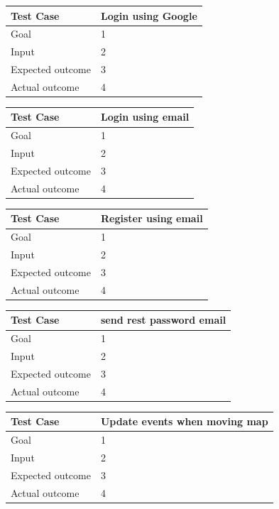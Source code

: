 \documentclass[a4paper]{scrreprt}
\begin{document}
\bigskip
\noindent
\begin{tabularx}{\linewidth}{|l|X|}
	\hline
	\textbf{Test Case} 	& \textbf{Login using Google} \\ \hline
	Goal 				& 1 \\ \hline
	Input 				& 2 \\ \hline
	Expected outcome 	& 3 \\ \hline
	Actual outcome 		& 4 \\ \hline
\end{tabularx}
\bigskip
\noindent
\begin{tabularx}{\linewidth}{|l|X|}
	\hline
	\textbf{Test Case} 	& \textbf{Login using email} \\ \hline
	Goal 				& 1 \\ \hline
	Input 				& 2 \\ \hline
	Expected outcome 	& 3 \\ \hline
	Actual outcome 		& 4 \\ \hline
\end{tabularx}
\bigskip
\noindent
\begin{tabularx}{\linewidth}{|l|X|}
	\hline
	\textbf{Test Case} 	& \textbf{Register using email} \\ \hline
	Goal 				& 1 \\ \hline
	Input 				& 2 \\ \hline
	Expected outcome 	& 3 \\ \hline
	Actual outcome 		& 4 \\ \hline
\end{tabularx}
\bigskip
\noindent
\begin{tabularx}{\linewidth}{|l|X|}
	\hline
	\textbf{Test Case} 	& \textbf{send rest password email} \\ \hline
	Goal 				& 1 \\ \hline
	Input 				& 2 \\ \hline
	Expected outcome 	& 3 \\ \hline
	Actual outcome 		& 4 \\ \hline
\end{tabularx}
\bigskip
\noindent
\begin{tabularx}{\linewidth}{|l|X|}
	\hline
	\textbf{Test Case} 	& \textbf{Update events when moving map} \\ \hline
	Goal 				& 1 \\ \hline
	Input 				& 2 \\ \hline
	Expected outcome 	& 3 \\ \hline
	Actual outcome 		& 4 \\ \hline
\end{tabularx}
\end{document}

